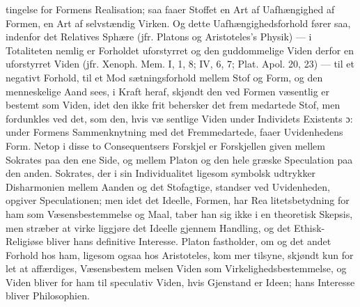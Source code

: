 \documentclass[12pt,a4paper]{book}
\begin{document}
tingelse for Formens Realisation; saa faaer Stoffet en Art af
Uafhængighed af Formen, en Art af selvstændig Virken. Og
dette Uafhængighedsforhold fører saa, indenfor det Relatives
Sphære (jfr. Platons og Aristoteles's Physik) --- i Totaliteten
nemlig er Forholdet uforstyrret og den guddommelige Viden
derfor en uforstyrret Viden (jfr. Xenoph. Mem. I, 1, 8; IV, 6,
7; Plat. Apol. 20, 23) --- til et negativt Forhold, til et Mod\-%
sætningsforhold mellem Stof og Form, og den menneskelige
Aand sees, i Kraft heraf, skjøndt den ved Formen væsentlig
er bestemt som Viden, idet den ikke frit behersker det frem\-%
medartede Stof, men fordunkles ved det, som den, hvis væ\-%
sentlige Viden under Individets Existents ɔ: under Formens
Sammenknytning med det Fremmedartede, faaer Uvidenhedens
Form. Netop i disse to Consequentsers Forskjel er Forskjellen
given mellem Sokrates paa den ene Side, og mellem Platon
og den hele græske Speculation paa den anden. Sokrates, der
i sin Individualitet ligesom symbolsk udtrykker Disharmonien
mellem Aanden og det Stofagtige, standser ved Uvidenheden,
opgiver Speculationen; men idet det Ideelle, Formen, har Rea\-%
litetsbetydning for ham som Væsensbestemmelse og Maal, taber
han sig ikke i en theoretisk Skepsis, men stræber at virke\-%
liggjøre det Ideelle gjennem Handling, og det Ethisk-Religiøse
bliver hans definitive Interesse. Platon fastholder, om og det
andet Forhold hos ham, ligesom ogsaa hos Aristoteles, kom\-%
mer tilsyne, skjøndt kun for let at affærdiges, Væsensbestem\-%
melsen Viden som Virkelighedsbestemmelse, og Viden bliver
for ham til speculativ Viden, hvis Gjenstand er Ideen; hans
Interesse bliver Philosophien.
\end{document}
